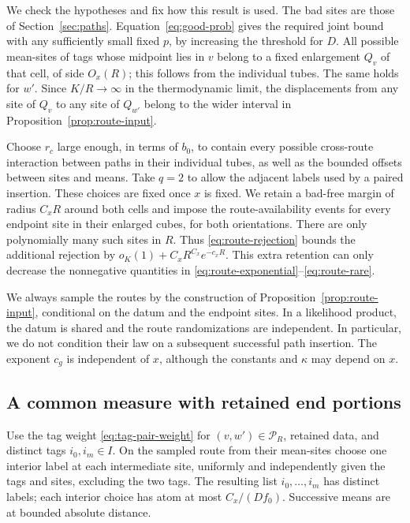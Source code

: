 We check the hypotheses and fix how this result is used.  The bad sites
are those of Section~\ref{sec:paths}.  Equation~\eqref{eq:good-prob}
gives the required joint bound with any sufficiently small fixed $p$,
by increasing the threshold for $D$.  All possible mean-sites of tags
whose midpoint lies in $v$ belong to a fixed enlargement $Q_v$ of that
cell, of side $O_x(R)$; this follows from the individual tubes.  The
same holds for $w'$.  Since $K/R\to\infty$ in the thermodynamic limit,
the displacements from any site of $Q_v$ to any site of $Q_{w'}$
belong to the wider interval in Proposition~\ref{prop:route-input}.

Choose $r_c$ large enough, in terms of $b_0$, to contain every possible
cross-route interaction between paths in their individual tubes, as
well as the bounded offsets between sites and means.  Take $q=2$ to
allow the adjacent labels used by a paired insertion.  These choices
are fixed once $x$ is fixed.  We retain a bad-free margin of radius
$C_xR$ around both cells and impose the route-availability events for
every endpoint site in their enlarged cubes, for both orientations.
There are only polynomially many such sites in $R$.  Thus
\eqref{eq:route-rejection} bounds the additional rejection by
$o_K(1)+C_xR^{C_x}e^{-c_xR}$.  This extra retention can only decrease
the nonnegative quantities in
\eqref{eq:route-exponential}--\eqref{eq:route-rare}.

We always sample the routes by the construction of
Proposition~\ref{prop:route-input}, conditional on the datum and the
endpoint sites.  In a likelihood product, the datum is shared and the
route randomizations are independent.  In particular, we do not
condition their law on a subsequent successful path insertion.
The exponent $c_g$ is independent of $x$, although the constants and
$\kappa$ may depend on $x$.

\subsection{A common measure with retained end portions}

Use the tag weight \eqref{eq:tag-pair-weight} for $(v,w')\in\mathcal P_R$,
retained data, and distinct tags $i_0,i_m\in I$.  On the sampled route
from their mean-sites choose one interior label at each intermediate
site, uniformly and independently given the tags and sites, excluding
the two tags.  The resulting list $i_0,\ldots,i_m$ has distinct labels;
each interior choice has atom at most $C_x/(Df_0)$.  Successive means
are at bounded absolute distance.

